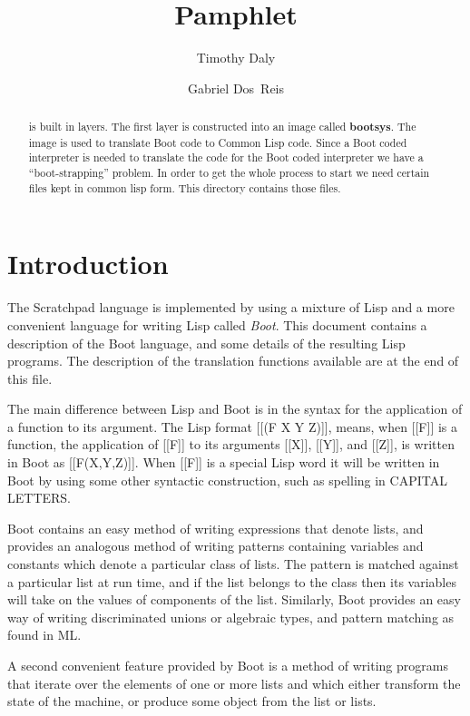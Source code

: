 \documentclass{article}
\title{\File{src/boot/Makefile} Pamphlet}
\author{Timothy Daly \and Gabriel Dos~Reis}
\begin{document}
\maketitle

\begin{abstract}
   is built in layers. The first layer is constructed into
  an image called {\bf bootsys}. The  image is used
  to translate Boot code to Common Lisp code.  Since a Boot coded
  interpreter is needed to translate the code for the Boot coded
  interpreter we have a ``boot-strapping'' problem.  In order to get
  the whole process to start we need certain files kept in
  common lisp form. This directory contains those files.
\end{abstract}
\eject

\tableofcontents
\eject

\section{Introduction}
\label{sec:intro}

The Scratchpad language is implemented by using a mixture of Lisp and
a more convenient language for writing Lisp called \emph{Boot}.
This document contains a description of the Boot language, and some
details of the resulting Lisp programs.
The description of the translation
functions available are at the end of this file.

The main difference between Lisp and Boot is in the syntax for
the application of a function to its argument.
The Lisp format [[(F X Y Z)]], means, when [[F]] is a function,
the application of [[F]] to its arguments [[X]], [[Y]], and [[Z]],
is written in Boot as [[F(X,Y,Z)]].
When [[F]] is a special Lisp word it will be written
in Boot by using some other syntactic construction, such as spelling
in CAPITAL LETTERS.

Boot contains an easy method of writing expressions that denote lists,
and provides an analogous method of writing patterns containing variables
and constants which denote a particular class of lists.  The pattern
is matched against a particular list at run time,
and if the list belongs to the class then its variables will
take on the values of components of the list.  Similarly, Boot provides
an easy way of writing discriminated unions or algebraic types, and
pattern matching as found in ML.

 A second convenient feature provided by Boot is a method of
writing programs that iterate over the elements of one or more lists
and which either transform the state of the machine, or
produce some object from the list or lists.
\end{document}
